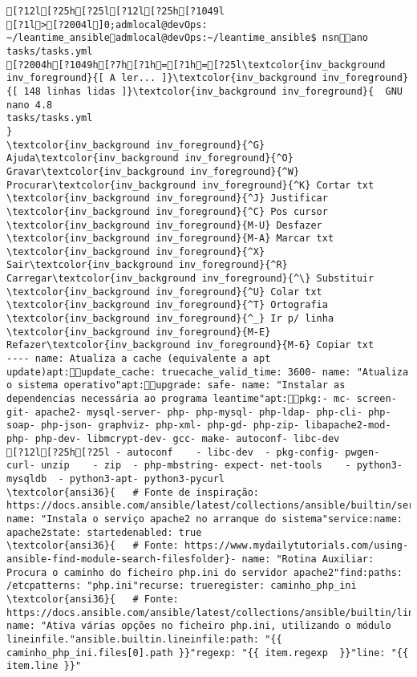 \documentclass{scrartcl}
\begin{document}
\begin{Verbatim}
[?12l[?25h[?25l[?12l[?25h[?1049l
[?1l>[?2004l]0;admlocal@devOps: ~/leantime_ansibleadmlocal@devOps:~/leantime_ansible$ nsnano tasks/tasks.yml 
[?2004h[?1049h[?7h[?1h=[?1h=[?25l\textcolor{inv_background inv_foreground}{[ A ler... ]}\textcolor{inv_background inv_foreground}{[ 148 linhas lidas ]}\textcolor{inv_background inv_foreground}{  GNU nano 4.8                                                tasks/tasks.yml                                                             }
\textcolor{inv_background inv_foreground}{^G} Ajuda\textcolor{inv_background inv_foreground}{^O} Gravar\textcolor{inv_background inv_foreground}{^W} Procurar\textcolor{inv_background inv_foreground}{^K} Cortar txt    \textcolor{inv_background inv_foreground}{^J} Justificar    \textcolor{inv_background inv_foreground}{^C} Pos cursor    \textcolor{inv_background inv_foreground}{M-U} Desfazer     \textcolor{inv_background inv_foreground}{M-A} Marcar txt
\textcolor{inv_background inv_foreground}{^X} Sair\textcolor{inv_background inv_foreground}{^R} Carregar\textcolor{inv_background inv_foreground}{^\} Substituir    \textcolor{inv_background inv_foreground}{^U} Colar txt     \textcolor{inv_background inv_foreground}{^T} Ortografia    \textcolor{inv_background inv_foreground}{^_} Ir p/ linha   \textcolor{inv_background inv_foreground}{M-E} Refazer\textcolor{inv_background inv_foreground}{M-6} Copiar txt
---- name: Atualiza a cache (equivalente a apt update)apt:update_cache: truecache_valid_time: 3600- name: "Atualiza o sistema operativo"apt:upgrade: safe- name: "Instalar as dependencias necessária ao programa leantime"apt:pkg:- mc- screen- git- apache2- mysql-server- php- php-mysql- php-ldap- php-cli- php-soap- php-json- graphviz- php-xml- php-gd- php-zip- libapache2-mod-php- php-dev- libmcrypt-dev- gcc- make- autoconf- libc-dev
[?12l[?25h[?25l - autoconf    - libc-dev  - pkg-config- pwgen- curl- unzip    - zip  - php-mbstring- expect- net-tools    - python3-mysqldb  - python3-apt- python3-pycurl
\textcolor{ansi36}{   # Fonte de inspiração: https://docs.ansible.com/ansible/latest/collections/ansible/builtin/service_module.html}- name: "Instala o serviço apache2 no arranque do sistema"service:name: apache2state: startedenabled: true
\textcolor{ansi36}{   # Fonte: https://www.mydailytutorials.com/using-ansible-find-module-search-filesfolder}- name: "Rotina Auxiliar: Procura o caminho do ficheiro php.ini do servidor apache2"find:paths: /etcpatterns: "php.ini"recurse: trueregister: caminho_php_ini
\textcolor{ansi36}{   # Fonte: https://docs.ansible.com/ansible/latest/collections/ansible/builtin/lineinfile_module.html}- name: "Ativa várias opções no ficheiro php.ini, utilizando o módulo lineinfile."ansible.builtin.lineinfile:path: "{{ caminho_php_ini.files[0].path }}"regexp: "{{ item.regexp  }}"line: "{{ item.line }}"

\end{Verbatim}
\end{document}
